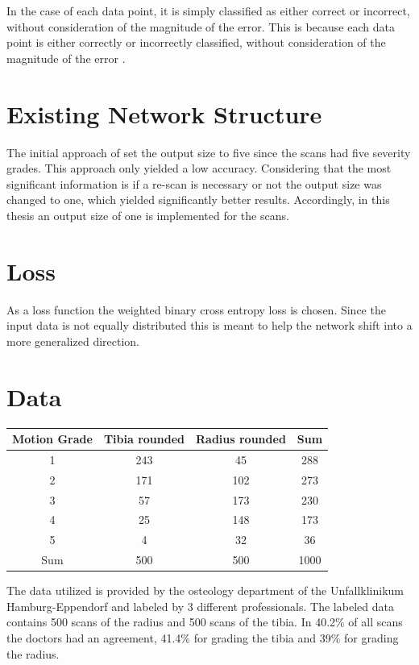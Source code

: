 \documentclass[
a4paper, 
12pt,
grayscalebody, %
abstract=on,
twoside, BCOR10mm, 12pt, DIV13,headinclude, footexclude, final, abstracton, openright
]{ibireprt}
\numberwithin{equation}{chapter}
\numberwithin{table}{chapter}
\numberwithin{figure}{chapter}
\numberwithin{algorithm}{chapter}
\numberwithin{example}{chapter}
\numberwithin{example}{chapter}
\begin{document}
In the case of each data point, it is simply classified as either correct or incorrect, without consideration of the magnitude of the error. This is because each data point is either correctly or incorrectly classified, without consideration of the magnitude of the error \citep{Dinga2019}. 


\section{Existing Network Structure}
The initial approach of \citet{Walle2023} set the output size to five since the scans had five severity grades. This approach only yielded a low accuracy. Considering that the most significant information is if a re-scan is necessary or not the output size was changed to one, which yielded significantly better results. Accordingly, in this thesis an output size of one is implemented for the scans.

\section{Loss}
As a loss function the weighted binary cross entropy loss is chosen. Since the input data is not equally distributed this is meant to help the network shift into a more generalized direction.

\section{Data}
\begin{center}
	\begin{tabular}{||c|c|c||c||}
		
		Motion Grade&  Tibia rounded& Radius rounded & Sum 	\\
		\hline
		\hline
		1 &  243&  45& 288   \\
		\hline
		2 &  171 & 102&  273\\
		\hline
		3 &  57&  173&  230 \\
		\hline
		4 &   25 & 148&  173 \\
		\hline
		5 &  4& 32&   36\\
		\hline
		\hline
		Sum&500&500&1000\\
		
		\hline
	\end{tabular}
\end{center}

The data utilized is provided by the osteology department of the Unfallklinikum Hamburg-Eppendorf and labeled by 3 different professionals.
The labeled data contains 500 scans of the radius and 500 scans of the tibia. In  40.2\% of all scans the doctors had an agreement, 41.4\% for grading the tibia and 39\% for grading the radius. 
\end{document}
